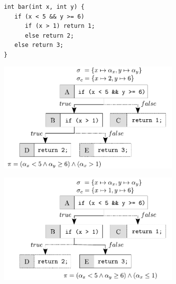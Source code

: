 \begin{figure}[t]
  \begin{subfigure}{.29\textwidth}
    \vspace{5mm}
    \begin{lstlisting}[basicstyle=\ttfamily\scriptsize]
int bar(int x, int y) {
   if (x < 5 && y >= 6) 
      if (x > 1) return 1;
      else return 2;
   else return 3;
}
    \end{lstlisting}
    \vspace{5mm}
    \caption{}
  \end{subfigure}%
  \hspace{-2mm}
  \begin{subfigure}{.37\textwidth}
    \centering
    \includegraphics[width=1.0\columnwidth]{images/concolic-execution} 
    \caption{}
  \end{subfigure}%
  \hspace{-2mm}
  \begin{subfigure}{.33\textwidth}
    \centering
    \vspace{0.03mm}
    \includegraphics[width=1.1\columnwidth]{images/concolic-execution-2} 

\end{subfigure}
\end{figure}
